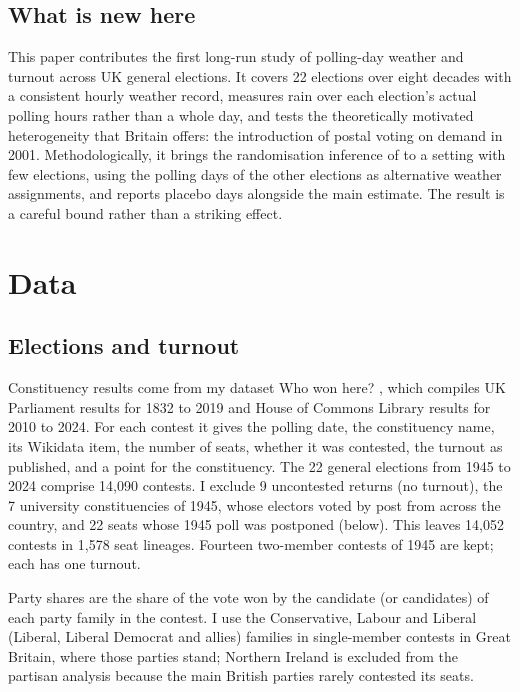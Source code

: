 \documentclass[11pt,a4paper]{article}
\begin{document}
\subsection{What is new here}
This paper contributes the first long-run study of polling-day weather and turnout across UK general elections. It covers 22 elections over eight decades with a consistent hourly weather record, measures rain over each election's actual polling hours rather than a whole day, and tests the theoretically motivated heterogeneity that Britain offers: the introduction of postal voting on demand in 2001. Methodologically, it brings the randomisation inference of \citet{cooperman2017} to a setting with few elections, using the polling days of the other elections as alternative weather assignments, and reports placebo days alongside the main estimate. The result is a careful bound rather than a striking effect.

\section{Data}\label{sec:data}
\subsection{Elections and turnout}
Constituency results come from my dataset Who won here? \citep{hotham2026ele}, which compiles UK Parliament results for 1832 to 2019 and House of Commons Library results for 2010 to 2024. For each contest it gives the polling date, the constituency name, its Wikidata item, the number of seats, whether it was contested, the turnout as published, and a point for the constituency. The 22 general elections from 1945 to 2024 comprise 14{,}090 contests. I exclude 9 uncontested returns (no turnout), the 7 university constituencies of 1945, whose electors voted by post from across the country, and 22 seats whose 1945 poll was postponed (below). This leaves 14{,}052 contests in 1{,}578 seat lineages. Fourteen two-member contests of 1945 are kept; each has one turnout.

Party shares are the share of the vote won by the candidate (or candidates) of each party family in the contest. I use the Conservative, Labour and Liberal (Liberal, Liberal Democrat and allies) families in single-member contests in Great Britain, where those parties stand; Northern Ireland is excluded from the partisan analysis because the main British parties rarely contested its seats.
\end{document}
